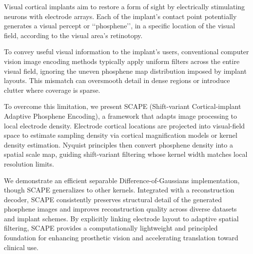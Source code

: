 Visual cortical implants aim to restore a form of sight by electrically stimulating neurons with electrode arrays. Each of the implant's contact point potentially generates a visual percept or ‘‘phosphene’’, in a specific location of the visual field, according to the visual area's retinotopy.

To convey useful visual information to the implant's users, conventional computer vision image encoding methods typically apply uniform filters across the entire visual field, ignoring the uneven phosphene map distribution imposed by implant layouts. 
This mismatch can oversmooth detail in dense regions or introduce clutter where coverage is sparse.

To overcome this limitation, we present SCAPE (Shift-variant Cortical-implant Adaptive Phosphene Encoding), a framework that adapts image processing to local electrode density. 
Electrode cortical locations are projected into visual-field space to estimate sampling density via cortical magnification models or kernel density estimation. Nyquist principles then convert phosphene density into a spatial scale map, guiding shift-variant filtering whose kernel width matches local resolution limits.

We demonstrate an efficient separable Difference-of-Gaussians implementation, though SCAPE generalizes to other kernels. Integrated with a reconstruction decoder, SCAPE consistently preserves structural detail of the generated phosphene images and improves reconstruction quality across diverse datasets and implant schemes. By explicitly linking electrode layout to adaptive spatial filtering, SCAPE provides a computationally lightweight and principled foundation for enhancing prosthetic vision and accelerating translation toward clinical use.